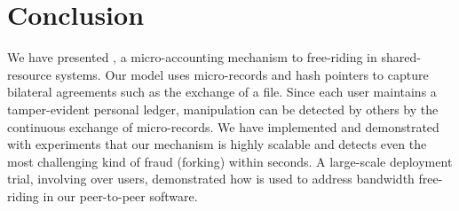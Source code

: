 \section{Conclusion}
We have presented \ModelName{}, a micro-accounting mechanism to free-riding in shared-resource systems.
Our model uses micro-records and hash pointers to capture bilateral agreements such as the exchange of a file.
Since each user maintains a tamper-evident personal ledger, manipulation can be detected by others by the continuous exchange of micro-records.
We have implemented \ModelName{} and demonstrated with experiments that our mechanism is highly scalable and detects even the most challenging kind of fraud (forking) within seconds.
A large-scale deployment trial, involving over \TrialUsers{} users, demonstrated how \ModelName{} is used to address bandwidth free-riding in our peer-to-peer software.